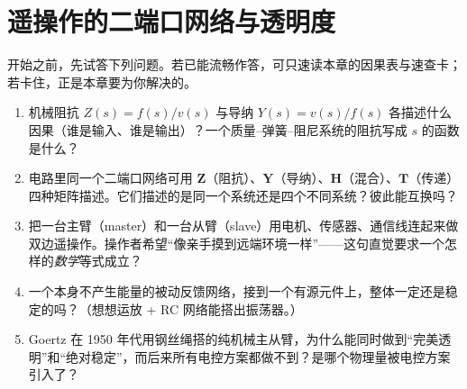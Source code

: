 \chapter{遥操作的二端口网络与透明度}
\label{ch:teleop-twoport}


\begin{practice}[前置自测]
开始之前，先试答下列问题。若已能流畅作答，可只速读本章的因果表与速查卡；若卡住，正是本章要为你解决的。
\begin{enumerate}
  \item 机械阻抗 $Z(s)=f(s)/v(s)$ 与导纳 $Y(s)=v(s)/f(s)$ 各描述什么因果（谁是输入、谁是输出）？一个质量--弹簧--阻尼系统的阻抗写成 $s$ 的函数是什么？
  \item 电路里同一个二端口网络可用 $\mathbf Z$（阻抗）、$\mathbf Y$（导纳）、$\mathbf H$（混合）、$\mathbf T$（传递）四种矩阵描述。它们描述的是同一个系统还是四个不同系统？彼此能互换吗？
  \item 把一台主臂（master）和一台从臂（slave）用电机、传感器、通信线连起来做双边遥操作。操作者希望“像亲手摸到远端环境一样”——这句直觉要求一个怎样的\emph{数学}等式成立？
  \item 一个本身不产生能量的被动反馈网络，接到一个有源元件上，整体一定还是稳定的吗？（想想运放 + RC 网络能搭出振荡器。）
  \item Goertz 在 1950 年代用钢丝绳搭的纯机械主从臂，为什么能同时做到“完美透明”和“绝对稳定”，而后来所有电控方案都做不到？是哪个物理量被电控方案引入了？
\end{enumerate}
\end{practice}

